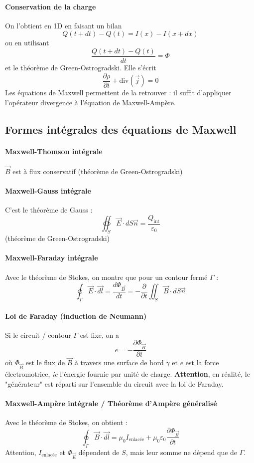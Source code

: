 \documentclass[french]{book}
\theoremstyle{plain}
\theoremstyle{definition}
\theoremstyle{remark}
\renewcommand{\div}{\text{div}}
\begin{document}
\paragraph{Conservation de la charge} On l'obtient en 1D en faisant un bilan $$Q(t+dt)-Q(t)=I(x)-I(x+dx)$$ ou en utilisant $$\frac{Q(t+dt)-Q(t)}{dt}=\Phi$$ et le théorème de Green-Ostrogradski. Elle s'écrit $$\frac{\partial\rho}{\partial t}+\div\left(\overrightarrow{j}\right)=0$$ Les équations de Maxwell permettent de la retrouver : il suffit d'appliquer l'opérateur divergence à l'équation de Maxwell-Ampère.

\subsection{Formes intégrales des équations de Maxwell}
\paragraph{Maxwell-Thomson intégrale} $\overrightarrow{B}$ est à flux conservatif (théorème de Green-Ostrogradski)
\paragraph{Maxwell-Gauss intégrale} C'est le théorème de Gauss : $$\oiint_S\overrightarrow{E}\cdot dS\overrightarrow{n}=\frac{Q_\text{int}}{\varepsilon_0}$$ (théorème de Green-Ostrogradski)
\paragraph{Maxwell-Faraday intégrale} Avec le théorème de Stokes, on montre que pour un contour fermé $\Gamma$ : $$\oint_\Gamma\overrightarrow{E}\cdot\overrightarrow{dl}=\frac{d\Phi_{\overrightarrow{B}}}{dt}=-\frac{\partial}{\partial t}\iint_S\overrightarrow{B}\cdot dS\overrightarrow{n}$$
\paragraph{Loi de Faraday (induction de Neumann)} Si le circuit / contour $\Gamma$ est fixe, on a $$e=-\frac{\partial \Phi_{\overrightarrow{B}}}{\partial t}$$ où $\Phi_{\overrightarrow{B}}$ est le flux de $\overrightarrow{B}$ à travers une surface de bord $\gamma$ et $e$ est la force électromotrice, \textit{ie} l'énergie fournie par unité de charge. \textbf{Attention}, en réalité, le "générateur" est réparti sur l'ensemble du circuit avec la loi de Faraday.
\paragraph{Maxwell-Ampère intégrale / Théorème d'Ampère généralisé} Avec le théorème de Stokes, on obtient : $$\oint_\Gamma\overrightarrow{B}\cdot\overrightarrow{dl}=\mu_0I_\text{enlacée}+\mu_0\varepsilon_0\frac{\partial \Phi_{\overrightarrow{E}}}{\partial t}$$ Attention, $I_\text{enlacée}$ et $\Phi_{\overrightarrow{E}}$ dépendent de $S$, mais leur somme ne dépend que de $\Gamma$.
\end{document}
